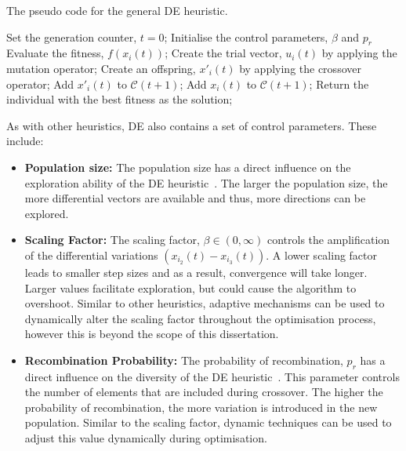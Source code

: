 \begin{algorithm}[H]
      \caption{The pseudo code for the general \acs{DE} heuristic.}
      \label{algo:heuristics:de:general_de}
      \begin{algorithmic}
            \State Set the generation counter, $t = 0$;
            \State Initialise the control parameters, $\beta$ and $p_{r}$
            \State Evaluate the fitness, $f(x_{i}(t))$;
            \State Create the trial vector, $u_{i}(t)$ by applying the mutation operator;
            \State Create an offspring, $x'_{i}(t)$ by applying the crossover operator;
            \State Add $x'_{i}(t)$ to $\mathcal{C}(t+1)$;
            \Else
            \State Add $x_{i}(t)$ to $\mathcal{C}(t+1)$;
            \EndIf
            \EndFor
            \EndWhile
            \State Return the individual with the best fitness as the solution;
      \end{algorithmic}
\end{algorithm}

As with other heuristics, \acs{DE} also contains a set of control parameters. These include:

\begin{itemize}
      \item \textbf{Population size:} The population size has a direct influence on the exploration ability of the \acs{DE} heuristic~\cite{ref:engelbrecht:2007}. The larger the population size, the more differential vectors are available and thus, more directions can be explored.

      \item \textbf{Scaling Factor:} The scaling factor, $\beta \in (0, \infty)$ controls the amplification of the differential variations $(x_{i_{2}}(t) - x_{i_{3}}(t))$. A lower scaling factor leads to smaller step sizes and as a result, convergence will take longer. Larger values facilitate exploration, but could cause the algorithm to overshoot. Similar to other heuristics, adaptive mechanisms can be used to dynamically alter the scaling factor throughout the optimisation process, however this is beyond the scope of this dissertation.


      \item \textbf{Recombination Probability:} The probability of recombination, $p_{r}$ has a direct influence on the diversity of the \acs{DE} heuristic~\cite{ref:engelbrecht:2007}. This parameter controls the number of elements that are included during crossover. The higher the probability of recombination, the more variation is introduced in the new population. Similar to the scaling factor, dynamic techniques can be used to adjust this value dynamically during optimisation.
\end{itemize}

